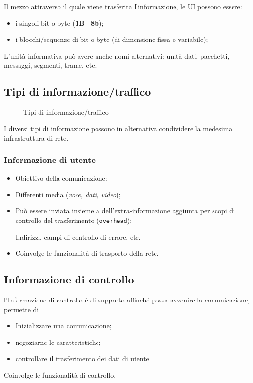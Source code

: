 Il mezzo attraverso il quale viene trasferita l'informazione, le UI possono essere:
\begin{itemize}
\item i singoli bit o byte (\textbf{1B=8b});
\item i blocchi/sequenze di bit o byte (di dimensione fissa o variabile);
\end{itemize}
\begin{nota}
  L'unità informativa può avere anche nomi alternativi: unità dati, pacchetti, messaggi, segmenti, trame, etc.
\end{nota}

\subsection{Tipi di informazione/traffico}
\label{sec:tipidiinformazione}
\begin{figure}[ht]
  \centering
  \resizebox{5in}{!}{}
  \caption{Tipi di informazione/traffico}
  \label{fig:traffic}
\end{figure}
\begin{oss}
  I diversi tipi di informazione possono in alternativa condividere la medesima infrastruttura di
  rete.
\end{oss}

\subsubsection{Informazione di utente}
\label{sec:infoutente}

\begin{itemize}
\item Obiettivo della comunicazione;
\item Differenti media (\textit{voce, dati, video});
\item Può essere inviata insieme a dell'extra-informazione aggiunta per scopi di controllo del trasferimento
  (\texttt{overhead});
\begin{esempio}
  Indirizzi, campi di controllo di errore, etc.
\end{esempio}
\item Coinvolge le funzionalità di trasporto della rete.
\end{itemize}

\subsection{Informazione di controllo}
\label{sec:infocont}
l'Informazione di controllo è di supporto affinché possa avvenire la comunicazione, permette di
\begin{itemize}
\item Inizializzare una comunicazione;
\item negoziarne le caratteristiche;
\item controllare il trasferimento dei dati di utente
\end{itemize}
Coinvolge le funzionalità di controllo.

